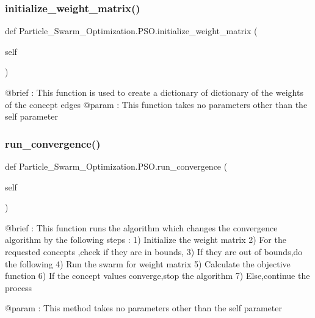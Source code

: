 \subsubsection{\texorpdfstring{initialize\+\_\+weight\+\_\+matrix()}{initialize\_weight\_matrix()}}
{\footnotesize\ttfamily def Particle\+\_\+\+Swarm\+\_\+\+Optimization.\+P\+S\+O.\+initialize\+\_\+weight\+\_\+matrix (\begin{DoxyParamCaption}\item[{}]{self }\end{DoxyParamCaption})}

\begin{DoxyVerb}@brief : This function is used to create a dictionary of dictionary of the weights of the concept edges
@param : This function takes no parameters other than the self parameter
\end{DoxyVerb}
 \hypertarget{class_particle___swarm___optimization_1_1_p_s_o_a9a1612724d06d65b4046b5ff26cb9cef}{}\label{class_particle___swarm___optimization_1_1_p_s_o_a9a1612724d06d65b4046b5ff26cb9cef} 
\subsubsection{\texorpdfstring{run\+\_\+convergence()}{run\_convergence()}}
{\footnotesize\ttfamily def Particle\+\_\+\+Swarm\+\_\+\+Optimization.\+P\+S\+O.\+run\+\_\+convergence (\begin{DoxyParamCaption}\item[{}]{self }\end{DoxyParamCaption})}

\begin{DoxyVerb}@brief : This function runs the algorithm which changes the convergence
         algorithm by the following steps :
         1) Initialize the weight matrix
         2) For the requested concepts ,check if they are in bounds,
         3) If they are out of bounds,do the following
         4) Run the swarm for weight matrix
         5) Calculate the objective function
         6) If the concept values converge,stop the algorithm
         7) Else,continue the process

@param  : This method takes no parameters other than the self parameter\end{DoxyVerb}
 \hypertarget{class_particle___swarm___optimization_1_1_p_s_o_a950b777176b42eb5b488c1b822cd0275}{}\label{class_particle___swarm___optimization_1_1_p_s_o_a950b777176b42eb5b488c1b822cd0275} 
